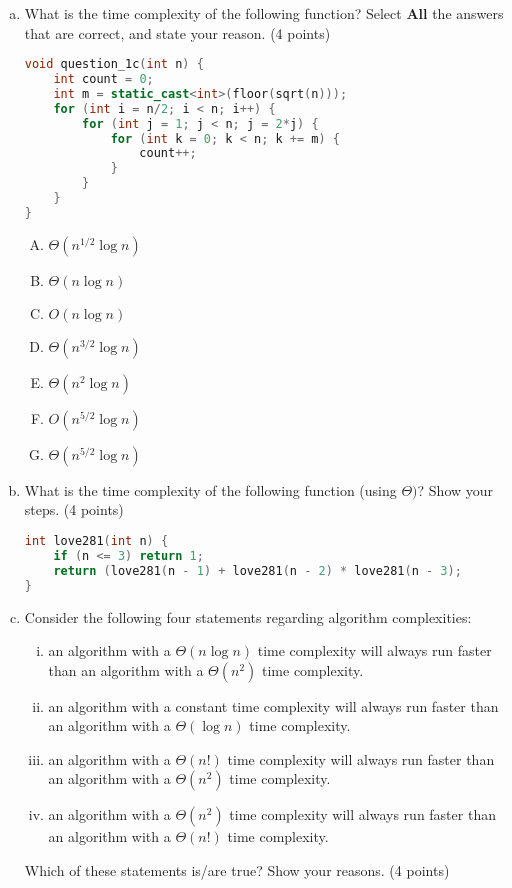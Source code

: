 \documentclass[11pt]{exam}
\begin{document}
\begin{enumerate}[(a)]
\item What is the time complexity of the following function? Select \textbf{All} the answers that are correct, and state your reason.  (4 points)
\begin{lstlisting}[language=c++]
void question_1c(int n) {
	int count = 0;
	int m = static_cast<int>(floor(sqrt(n)));
	for (int i = n/2; i < n; i++) {
		for (int j = 1; j < n; j = 2*j) {
			for (int k = 0; k < n; k += m) {
				count++;
			}
		}
	}
}
\end{lstlisting}
\begin{enumerate}[A)]
\item $\Theta(n^{1/2}\log n)$
\item $\Theta(n \log n)$
\item $O(n \log n)$
\item $\Theta(n^{3/2}\log n)$
\item $\Theta(n^2\log n)$
\item $O(n^{5/2}\log n)$
\item $\Theta(n^{5/2}\log n)$
\end{enumerate}
\begin{solution}
\end{solution}

\item What is the time complexity of the following function (using $\Theta)$? Show your steps. (4 points)
\begin{lstlisting}[language=c++]
int love281(int n) {
	if (n <= 3) return 1;
	return (love281(n - 1) + love281(n - 2) * love281(n - 3);
}
\end{lstlisting}
\begin{solution}
\end{solution}

\item Consider the following four statements regarding algorithm complexities:
\begin{enumerate}[i)]
\item an algorithm with a $\Theta(n \log n)$ time complexity will always run faster than an algorithm with a $\Theta(n^2)$ time complexity.
\item an algorithm with a constant time complexity will always run faster than an algorithm with a $\Theta(\log n)$ time complexity.
\item an algorithm with a $\Theta(n!)$ time complexity will always run faster than an algorithm with a $\Theta(n^2)$ time complexity.
\item an algorithm with a $\Theta(n^2)$ time complexity will always run faster than an algorithm with a $\Theta(n!)$ time complexity.
\end{enumerate}

Which of these statements is/are true? Show your reasons. (4 points)
\begin{solution}
~\\
\end{solution}

\end{enumerate}
\end{document}
